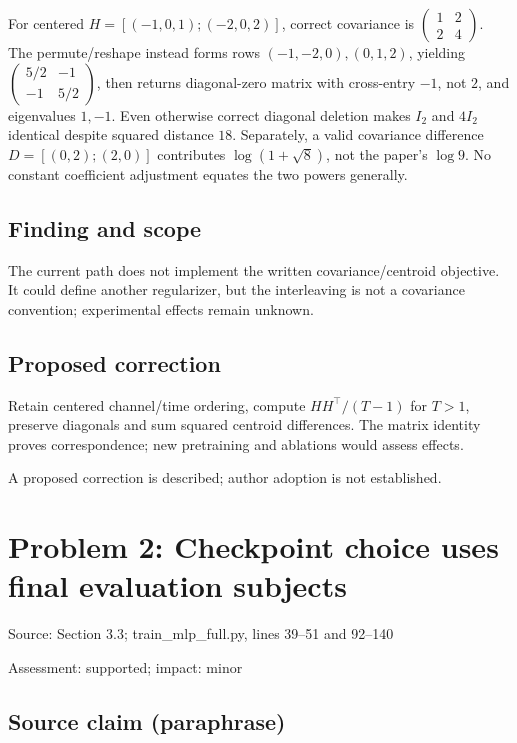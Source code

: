 \documentclass[11pt]{article}
\begin{document}
For centered \(H=[(-1,0,1);(-2,0,2)]\), correct covariance is \(\left(\begin{smallmatrix}1&2\\2&4\end{smallmatrix}\right)\). The permute/reshape instead forms rows \((-1,-2,0),(0,1,2)\), yielding \(\left(\begin{smallmatrix}5/2&-1\\-1&5/2\end{smallmatrix}\right)\), then returns diagonal-zero matrix with cross-entry \(-1\), not \(2\), and eigenvalues \(1,-1\). Even otherwise correct diagonal deletion makes \(I_2\) and \(4I_2\) identical despite squared distance \(18\). Separately, a valid covariance difference \(D=[(0,2);(2,0)]\) contributes \(\log(1+\sqrt8)\), not the paper’s \(\log9\). No constant coefficient adjustment equates the two powers generally.

\subsection*{Finding and scope}

The current path does not implement the written covariance/centroid objective. It could define another regularizer, but the interleaving is not a covariance convention; experimental effects remain unknown.

\subsection*{Proposed correction}

Retain centered channel/time ordering, compute \(HH^{\top}/(T-1)\) for \(T>1\), preserve diagonals and sum squared centroid differences. The matrix identity proves correspondence; new pretraining and ablations would assess effects.

A proposed correction is described; author adoption is not established.

\section*{Problem 2: Checkpoint choice uses final evaluation subjects}

Source: Section 3.3; train\_mlp\_full.py, lines 39–51 and 92–140

Assessment: supported; impact: minor

\subsection*{Source claim (paraphrase)}
\end{document}
